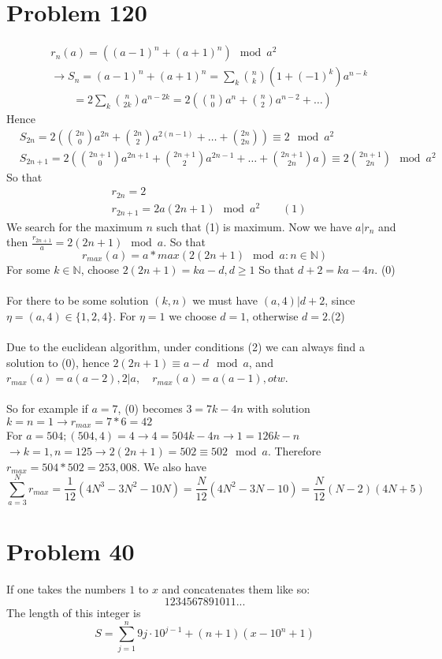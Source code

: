 \documentclass[12pt]{article}
\begin{document}
\section*{Problem 120}
\begin{align*}
    &r_n(a) = ((a-1)^n+ (a+1)^n) \mod a^2 \\
    & \rightarrow S_n = (a-1)^n+ (a+1)^n = \sum_{k} \binom{n}{k} (1 +(-1)^k)a^{n-k}\\
    & \qquad = 2 \sum_k \binom{n}{2k} a^{n-2k} = 2(\binom{n}{0}a^n+\binom{n}{2}a^{n-2}+\ldots)
\end{align*}
Hence
\begin{align*}
    &S_{2n} = 2(\binom{2n}{0}a^{2n} + \binom{2n}{2}a^{2(n-1)}+\ldots+ \binom{2n}{2n}) \equiv 2 \mod a^2\\
    &S_{2n+1} = 2( \binom{2n+1}{0} a^{2n+1} +\binom{2n+1}{2} a^{2n-1} +\ldots + \binom{2n+1}{2n}a) \equiv 2 \binom{2n+1}{2n} \mod a^2
\end{align*}
So that
\begin{align*}
    &r_{2n} = 2\\
    &r_{2n+1} = 2a(2n+1) \mod a^2 \qquad (1)
\end{align*}
We search for the maximum $n$ such that (1) is maximum. Now we have $a | r_n$ and then $\frac{r_{2n+1}}{a} = 2(2n+1) \mod a$. So that
$$
    r_{max}(a) = a*max(2(2n+1) \mod a : n \in \mathbb{N})
$$
For some $k \in \mathbb{N}$, choose $2(2n+1) = ka-d, d\geq 1$ So that $d+2 = ka-4n$. (0)\\
\\For there to be some solution $(k, n)$ we must have $(a, 4) | d+2$, since $\eta = (a, 4) \in \{1, 2, 4\}$. For $\eta = 1$ we choose $d = 1$, otherwise $d = 2$.(2)\\\\
Due to the euclidean algorithm, under conditions (2) we can always find a solution to (0), hence $2(2n+1) \equiv a-d \mod a$, and $r_{max}(a) = a(a-2), 2|a,\quad r_{max}(a) = a(a-1), otw$.\\\\
So for example if $a = 7$, (0) becomes $3 = 7k-4n$ with solution $k=n=1 \rightarrow r_{max} = 7*6 = 42$\\
For $a = 504; (504, 4) = 4 \rightarrow 4 = 504k-4n \rightarrow 1 = 126k-n$
$\rightarrow k = 1, n = 125 \rightarrow 2(2n+1) = 502 \equiv 502 \mod a$. Therefore $r_{max} = 504*502 = 253,008$.
We also have
$$
    \sum_{a = 3}^N r_{max} = \frac{1}{12}(4N^3-3N^2-10N) = \frac{N}{12}(4N^2-3N-10) = \frac{N}{12}(N-2)(4N+5)
$$
\section*{Problem 40}
If one takes the numbers $1$ to $x$ and concatenates them like so:
$$1234567891011...$$
The length of this integer is $$S =\sum_{j=1}^n 9j\cdot10^{j-1}+(n+1)(x-10^n+1)$$
\end{document}
